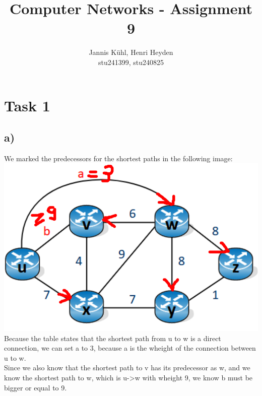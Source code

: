 \documentclass[12pt, a4paper]{article}
\title{Computer Networks - Assignment 9}
\author{Jannis Kühl, Henri Heyden\\ \small stu241399, stu240825}
\date{}
\begin{document}
\maketitle
\section*{Task 1}
\subsection*{a)}
We marked the predecessors for the shortest paths in the following image:
\includegraphics[width=\textwidth]{A1.png}
Because the table states that the shortest path from u to w is a direct connection, we can set a to 3, because a is the wheight of the connection between u to w. \\
Since we also know that the shortest path to v has its predecessor as w, and we know the shortest path to w, which is u->w with wheight 9, we know b must be bigger or equal to 9. \pagebreak
\end{document}
